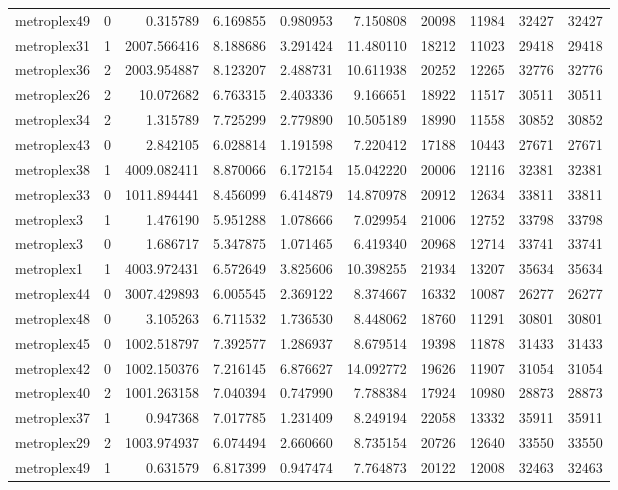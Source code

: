 \begin{longtable}{|l|r|r|r|r|r|r|r|r|r|}
metroplex49 & 0 & 0.315789 & 6.169855 & 0.980953 & 7.150808 & 20098 & 11984 & 32427 & 32427 \\
metroplex31 & 1 & 2007.566416 & 8.188686 & 3.291424 & 11.480110 & 18212 & 11023 & 29418 & 29418 \\
metroplex36 & 2 & 2003.954887 & 8.123207 & 2.488731 & 10.611938 & 20252 & 12265 & 32776 & 32776 \\
metroplex26 & 2 & 10.072682 & 6.763315 & 2.403336 & 9.166651 & 18922 & 11517 & 30511 & 30511 \\
metroplex34 & 2 & 1.315789 & 7.725299 & 2.779890 & 10.505189 & 18990 & 11558 & 30852 & 30852 \\
metroplex43 & 0 & 2.842105 & 6.028814 & 1.191598 & 7.220412 & 17188 & 10443 & 27671 & 27671 \\
metroplex38 & 1 & 4009.082411 & 8.870066 & 6.172154 & 15.042220 & 20006 & 12116 & 32381 & 32381 \\
metroplex33 & 0 & 1011.894441 & 8.456099 & 6.414879 & 14.870978 & 20912 & 12634 & 33811 & 33811 \\
metroplex3 & 1 & 1.476190 & 5.951288 & 1.078666 & 7.029954 & 21006 & 12752 & 33798 & 33798 \\
metroplex3 & 0 & 1.686717 & 5.347875 & 1.071465 & 6.419340 & 20968 & 12714 & 33741 & 33741 \\
metroplex1 & 1 & 4003.972431 & 6.572649 & 3.825606 & 10.398255 & 21934 & 13207 & 35634 & 35634 \\
metroplex44 & 0 & 3007.429893 & 6.005545 & 2.369122 & 8.374667 & 16332 & 10087 & 26277 & 26277 \\
metroplex48 & 0 & 3.105263 & 6.711532 & 1.736530 & 8.448062 & 18760 & 11291 & 30801 & 30801 \\
metroplex45 & 0 & 1002.518797 & 7.392577 & 1.286937 & 8.679514 & 19398 & 11878 & 31433 & 31433 \\
metroplex42 & 0 & 1002.150376 & 7.216145 & 6.876627 & 14.092772 & 19626 & 11907 & 31054 & 31054 \\
metroplex40 & 2 & 1001.263158 & 7.040394 & 0.747990 & 7.788384 & 17924 & 10980 & 28873 & 28873 \\
metroplex37 & 1 & 0.947368 & 7.017785 & 1.231409 & 8.249194 & 22058 & 13332 & 35911 & 35911 \\
metroplex29 & 2 & 1003.974937 & 6.074494 & 2.660660 & 8.735154 & 20726 & 12640 & 33550 & 33550 \\
metroplex49 & 1 & 0.631579 & 6.817399 & 0.947474 & 7.764873 & 20122 & 12008 & 32463 & 32463 \\

\end{longtable}
